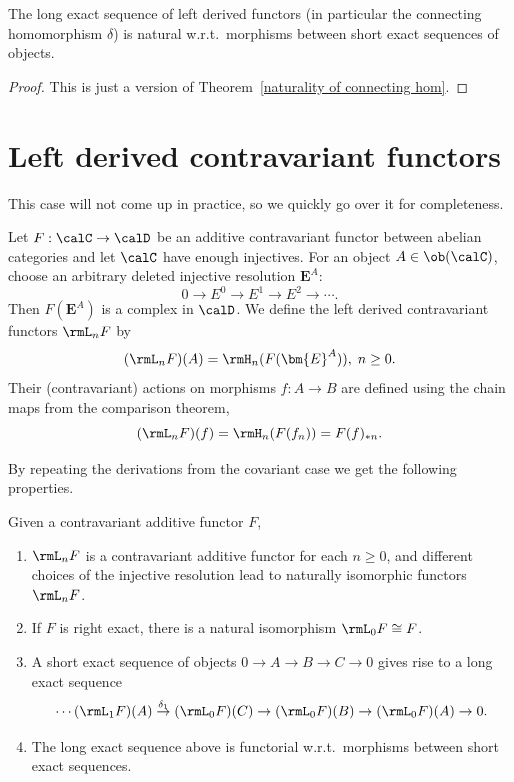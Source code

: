 \begin{prop}
    The long exact sequence of left derived functors (in particular the connecting homomorphism $\delta$) is natural w.r.t.\ morphisms between short exact sequences of objects.
\end{prop}
\begin{proof}
    This is just a version of Theorem~\ref{naturality of connecting hom}.
\end{proof}




\section{Left derived contravariant functors}


This case will not come up in practice, so we quickly go over it for completeness.

\begin{defn}
    Let $F:\calC\to \calD$ be an additive contravariant functor between abelian categories and let $\calC$ have enough injectives. For an object $A\in\ob(\calC)$, choose an arbitrary deleted injective resolution $\bm{E}^A$:
    \[0\to E^0\to E^1\to E^2\to\cdots.\]
    Then $F(\bm{E}^A)$ is a complex in $\calD$. We define the left derived contravariant functors $\rmL_nF$ by
    \[(\rmL_nF)(A)=\rmH_n(F(\bm{E}^A)),\; n\geq 0.\]
    Their (contravariant) actions on morphisms $f:A\to B$ are defined using the chain maps from the comparison theorem,
    \[(\rmL_nF)(f)=\rmH_n(F(f_n))=F(f)_{\ast n}.\]
\end{defn}

By repeating the derivations from the covariant case we get the following properties.

\begin{thm}
    Given a contravariant additive functor $F$, 
    \begin{enumerate}
        \item $\rmL_nF$ is a contravariant additive functor for each $n\geq 0$, and different choices of the injective resolution lead to naturally isomorphic functors $\rmL_nF$.
        \item If $F$ is right exact, there is a natural isomorphism $\rmL_0F\cong F$.
        \item A short exact sequence of objects $0\to A\to B\to C\to 0$ gives rise to a long exact sequence
        \[\cdots (\rmL_1F)(A)\overset{\delta_1}{\to} (\rmL_0F)(C)\to (\rmL_0F)(B)\to (\rmL_0F)(A)\to 0.\]
        \item The long exact sequence above is functorial w.r.t.\ morphisms between short exact sequences.
    \end{enumerate}
\end{thm}






